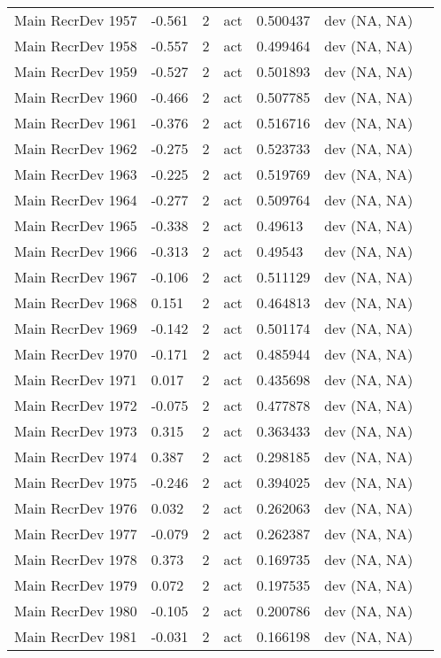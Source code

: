 \documentclass[11pt,
  english,
  letterpaper,
]{article}
\begin{document}
\begin{landscape}
\begin{longtable}[t]{>{\raggedright\arraybackslash}p{6cm}lllll>{\raggedright\arraybackslash}p{4cm}}
Main RecrDev 1957 & -0.561 & 2 & act & 0.500437 & dev (NA, NA)\\
Main RecrDev 1958 & -0.557 & 2 & act & 0.499464 & dev (NA, NA)\\
Main RecrDev 1959 & -0.527 & 2 & act & 0.501893 & dev (NA, NA)\\
Main RecrDev 1960 & -0.466 & 2 & act & 0.507785 & dev (NA, NA)\\
Main RecrDev 1961 & -0.376 & 2 & act & 0.516716 & dev (NA, NA)\\
Main RecrDev 1962 & -0.275 & 2 & act & 0.523733 & dev (NA, NA)\\
Main RecrDev 1963 & -0.225 & 2 & act & 0.519769 & dev (NA, NA)\\
Main RecrDev 1964 & -0.277 & 2 & act & 0.509764 & dev (NA, NA)\\
Main RecrDev 1965 & -0.338 & 2 & act & 0.49613 & dev (NA, NA)\\
Main RecrDev 1966 & -0.313 & 2 & act & 0.49543 & dev (NA, NA)\\
Main RecrDev 1967 & -0.106 & 2 & act & 0.511129 & dev (NA, NA)\\
Main RecrDev 1968 & 0.151 & 2 & act & 0.464813 & dev (NA, NA)\\
Main RecrDev 1969 & -0.142 & 2 & act & 0.501174 & dev (NA, NA)\\
Main RecrDev 1970 & -0.171 & 2 & act & 0.485944 & dev (NA, NA)\\
Main RecrDev 1971 & 0.017 & 2 & act & 0.435698 & dev (NA, NA)\\
Main RecrDev 1972 & -0.075 & 2 & act & 0.477878 & dev (NA, NA)\\
Main RecrDev 1973 & 0.315 & 2 & act & 0.363433 & dev (NA, NA)\\
Main RecrDev 1974 & 0.387 & 2 & act & 0.298185 & dev (NA, NA)\\
Main RecrDev 1975 & -0.246 & 2 & act & 0.394025 & dev (NA, NA)\\
Main RecrDev 1976 & 0.032 & 2 & act & 0.262063 & dev (NA, NA)\\
Main RecrDev 1977 & -0.079 & 2 & act & 0.262387 & dev (NA, NA)\\
Main RecrDev 1978 & 0.373 & 2 & act & 0.169735 & dev (NA, NA)\\
Main RecrDev 1979 & 0.072 & 2 & act & 0.197535 & dev (NA, NA)\\
Main RecrDev 1980 & -0.105 & 2 & act & 0.200786 & dev (NA, NA)\\
Main RecrDev 1981 & -0.031 & 2 & act & 0.166198 & dev (NA, NA)\\

\end{longtable}
\end{landscape}
\end{document}

